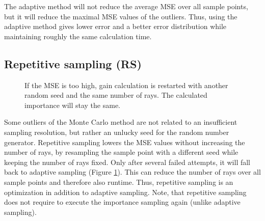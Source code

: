 The adaptive method will not reduce the average MSE over all sample points,
but it will reduce the maximal MSE values of the outliers. Thus, using the adaptive
method gives lower error and a better error distribution while maintaining
roughly the same calculation time.


\subsection{Repetitive sampling (RS)}
\begin{figure}[H]
  \centerline
  {}
  \caption{If the MSE is too high, gain calculation is restarted with another
    random seed and the same number of rays. The calculated importance will stay the same.}
  \label{graphic:pap4}
\end{figure}
Some outliers of the Monte Carlo method are not related to an insufficient
sampling resolution, but rather an unlucky seed for the random number generator.
Repetitive sampling lowers the MSE values without increasing the number of rays,
by resampling the sample point with a different seed while keeping the number of
rays fixed. Only after several failed attempts, it will fall back to adaptive
sampling (Figure \ref{graphic:pap4}). This can reduce the number of rays over all sample points and therefore
also runtime. Thus, repetitive sampling is an optimization in addition to adaptive sampling. 
Note, that repetitive sampling does not require to execute the importance
sampling again (unlike adaptive sampling).

